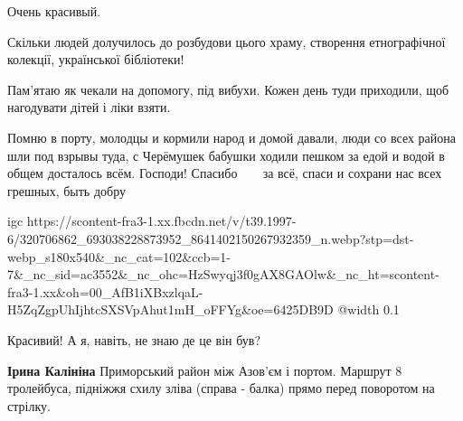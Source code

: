  
 
 
 
 

\qqSecCmt


Очень красивый.


Скільки людей долучилось до розбудови цього храму, створення етнографічної
колекції, української бібліотеки!


Пам'ятаю як чекали на допомогу, під вибухи. Кожен день туди приходили, щоб
нагодувати дітей і ліки взяти. 🙏🙏🙏🙏


Помню в порту, молодцы и кормили народ и домой давали, люди со всех района шли
под взрывы туда, с Черёмушек бабушки ходили пешком за едой и водой в общем
досталось всём. Господи! Спасибо🙏💕🙏💕🙏💕 за всё, спаси и сохрани нас всех
грешных, быть добру

\ifcmt
  igc https://scontent-fra3-1.xx.fbcdn.net/v/t39.1997-6/320706862_693038228873952_8641402150267932359_n.webp?stp=dst-webp_s180x540&_nc_cat=102&ccb=1-7&_nc_sid=ac3552&_nc_ohc=HzSwyqj3f0gAX8GAOlw&_nc_ht=scontent-fra3-1.xx&oh=00_AfB1iXBxzlqaL-H5ZqZgpUhIjhtcSXSVpAhut1mH_oFFYg&oe=6425DB9D
	@width 0.1
\fi


Красивий! А я, навіть, не знаю де це він був?

\begin{itemize} %
\textbf{Ірина Калініна} Приморський район між Азов'єм і портом. Маршрут 8 тролейбуса, підніжжя схилу зліва (справа - балка) прямо перед поворотом на стрілку.
\end{itemize} %
